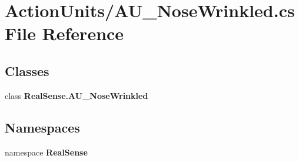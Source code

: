 \section{Action\+Units/\+A\+U\+\_\+\+Nose\+Wrinkled.cs File Reference}
\label{_a_u___nose_wrinkled_8cs}
\subsection*{Classes}
\begin{DoxyCompactItemize}
\item 
class \textbf{ Real\+Sense.\+A\+U\+\_\+\+Nose\+Wrinkled}
\end{DoxyCompactItemize}
\subsection*{Namespaces}
\begin{DoxyCompactItemize}
\item 
namespace \textbf{ Real\+Sense}
\end{DoxyCompactItemize}
